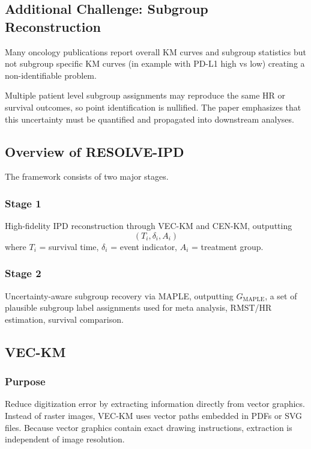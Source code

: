 \documentclass[11pt]{article}
\begin{document}
\subsection*{Additional Challenge: Subgroup Reconstruction}

Many oncology publications report overall KM curves and subgroup statistics but not subgroup specific KM curves (in example with PD-L1 high vs low) creating a non-identifiable problem.

Multiple patient level subgroup assignments may reproduce the same HR or survival outcomes, so point identification is nullified. The paper emphasizes that this uncertainty must be quantified and propagated into downstream analyses.

\subsection*{Overview of RESOLVE-IPD}

The framework consists of two major stages.

\subsubsection*{Stage 1}

High-fidelity IPD reconstruction through VEC-KM and CEN-KM, outputting \[(T_i,\delta_i,A_i)\] where \(T_i\) = survival time, \(\delta_i\) = event indicator, \(A_i\) = treatment group.

\subsubsection*{Stage 2}

Uncertainty-aware subgroup recovery via MAPLE, outputting $G_{\text{MAPLE}}$, a set of plausible subgroup label assignments used for meta analysis, RMST/HR estimation, survival comparison.

\subsection*{VEC-KM}

\subsubsection*{Purpose}

Reduce digitization error by extracting information directly from vector graphics. Instead of raster images, VEC-KM uses vector paths embedded in PDFs or SVG files. Because vector graphics contain exact drawing instructions, extraction is independent of image resolution.
\end{document}
